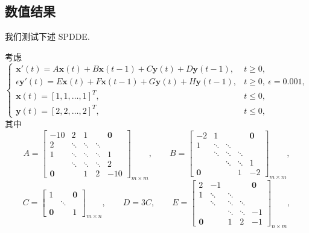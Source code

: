 \subsection{数值结果}
\label{sec:9-6-3}

我们测试下述 SPDDE.

\begin{example}
\label{ex:9-4}
考虑
\[
  \left\{
  \begin{array}{ll}
    \mathbf{x}'(t)=A\mathbf{x}(t)+B\mathbf{x}(t-1)+C\mathbf{y}(t)
      +D\mathbf{y}(t-1), & t\geqslant0,\\
    \epsilon\mathbf{y}'(t)=E\mathbf{x}(t)+F\mathbf{x}(t-1)+G\mathbf{y}(t)
      +H\mathbf{y}(t-1), & t\geqslant0,\ \epsilon=0.001,\\
    \mathbf{x}(t)=[1,1,\ldots,1]^T, & t\leqslant0,\\
    \mathbf{y}(t)=[2,2,\ldots,2]^T, & t\leqslant0,
  \end{array}
  \right.
\]
其中
\[
  A=\begin{bmatrix}
    -10 & 2 & 1 & & \mathbf{0}\\
    2 & \ddots & \ddots & \ddots & \\
    1 & \ddots & \ddots & \ddots & 1\\
    & \ddots & \ddots & \ddots & 2\\
    \mathbf{0} & & 1 & 2 & -10
  \end{bmatrix}_{m\times m},\qquad
  B=\begin{bmatrix}
    -2 & 1 & & & \mathbf{0}\\
    1 & \ddots & \ddots & & \\
    & \ddots & \ddots & \ddots & \\
    & & \ddots & \ddots & 1\\
    \mathbf{0} & & & 1 & -2
  \end{bmatrix}_{m\times m},
\]
\[
  C=\begin{bmatrix}
    1 & & \mathbf{0}\\
    & \ddots & \\
    \mathbf{0} & & 1
  \end{bmatrix}_{m\times n},\qquad
  D=3C,\qquad
  E=\begin{bmatrix}
    2 & -1 & & & \mathbf{0}\\
    1 & \ddots & \ddots & & \\
    & \ddots & \ddots & \ddots & \\
    & & \ddots & \ddots & -1\\
    \mathbf{0} & & 1 & 2 & -1
  \end{bmatrix}_{n\times m},
\]
\end{example}
